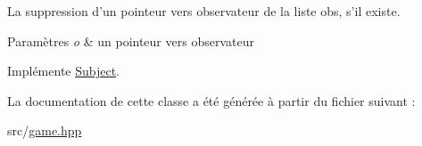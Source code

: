 La suppression d'un pointeur vers observateur de la liste obs, s'il existe. 


\begin{DoxyParams}{Paramètres}
{\em o} & un pointeur vers observateur \\
\hline
\end{DoxyParams}


Implémente \hyperlink{classSubject_a1005f6c36e1a65fb13f1f0fa908b82e0}{Subject}.



La documentation de cette classe a été générée à partir du fichier suivant \+:\begin{DoxyCompactItemize}
\item 
src/\hyperlink{game_8hpp}{game.\+hpp}\end{DoxyCompactItemize}

